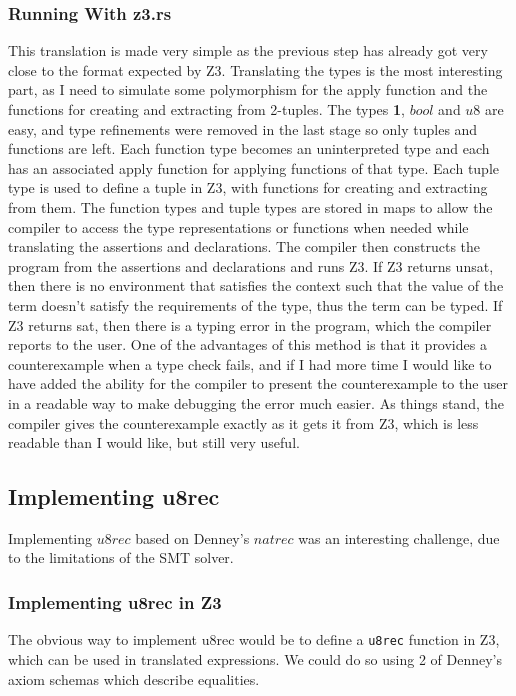 \subsubsection{Running With z3.rs}

This translation is made very simple as the previous step has already got very close to the format
expected by Z3.
Translating the types is the most interesting part, as I need to simulate some polymorphism for
the apply function and the functions for creating and extracting from 2-tuples.
The types \textbf{1}, $bool$ and $u8$ are easy, and type refinements were removed in the last
stage so only tuples and functions are left.
Each function type becomes an uninterpreted type and each has an associated apply function for
applying functions of that type.
Each tuple type is used to define a tuple in Z3, with functions for creating and extracting from
them.
The function types and tuple types are stored in maps to allow the compiler to access the type
representations or functions when needed while translating the assertions and declarations.
The compiler then constructs the program from the assertions and declarations and runs Z3.
If Z3 returns unsat, then there is no environment that satisfies the context such that the value
of the term doesn't satisfy the requirements of the type, thus the term can be typed.
If Z3 returns sat, then there is a typing error in the program, which the compiler reports to the
user.
One of the advantages of this method is that it provides a counterexample when a type check fails,
and if I had more time I would like to have added the ability for the compiler to present the
counterexample to the user in a readable way to make debugging the error much easier.
As things stand, the compiler gives the counterexample exactly as it gets it from Z3, which is less
readable than I would like, but still very useful.

\subsection{Implementing u8rec}

Implementing $u8rec$ based on Denney's $natrec$ was an interesting challenge, due to the limitations
of the SMT solver.

\subsubsection{Implementing u8rec in Z3}

The obvious way to implement u8rec would be to define a \texttt{u8rec} function in Z3, which can be
used in translated expressions.
We could do so using 2 of Denney's axiom schemas which describe equalities.

